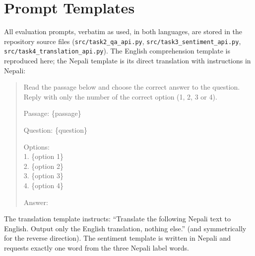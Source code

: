 \documentclass[conference]{IEEEtran}
\begin{document}
\appendix
\section{Prompt Templates}
All evaluation prompts, verbatim as used, in both languages, are stored in the repository source files (\texttt{src/task2\_qa\_api.py}, \texttt{src/task3\_sentiment\_api.py}, \texttt{src/task4\_translation\_api.py}). The English comprehension template is reproduced here; the Nepali template is its direct translation with instructions in Nepali:

\begin{quote}\small
Read the passage below and choose the correct answer to the question. Reply with only the number of the correct option (1, 2, 3 or 4).

Passage: \{passage\}

Question: \{question\}

Options:\\
1. \{option 1\}\\
2. \{option 2\}\\
3. \{option 3\}\\
4. \{option 4\}

Answer:
\end{quote}

The translation template instructs: ``Translate the following Nepali text to English. Output only the English translation, nothing else.'' (and symmetrically for the reverse direction). The sentiment template is written in Nepali and requests exactly one word from the three Nepali label words.
\end{document}
